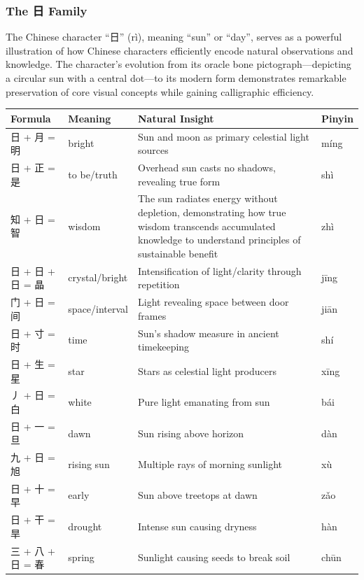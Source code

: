 \documentclass[11pt,letterpaper]{article}
\begin{document}
\subsubsection{The 日 Family}\label{the-ux65e5-family}

The Chinese character ``日'' (rì), meaning ``sun'' or ``day'', serves as
a powerful illustration of how Chinese characters efficiently encode
natural observations and knowledge. The character's evolution from its
oracle bone pictograph---depicting a circular sun with a central
dot---to its modern form demonstrates remarkable preservation of core
visual concepts while gaining calligraphic efficiency.

\begin{longtable}{|p{3cm}|p{3cm}|p{6cm}|p{2cm}|}
\hline
\textbf{Formula} & \textbf{Meaning} & \textbf{Natural Insight} & \textbf{Pinyin} \\
\hline
日 + 月 = 明 & bright & Sun and moon as primary celestial light sources
& míng \\
\hline
日 + 正 = 是 & to be/truth & Overhead sun casts no shadows, revealing
true form & shì \\
\hline
知 + 日 = 智 & wisdom & The sun radiates energy without depletion,
demonstrating how true wisdom transcends accumulated knowledge to
understand principles of sustainable benefit & zhì \\
\hline
日 + 日 + 日 = 晶 & crystal/bright & Intensification of light/clarity
through repetition & jīng \\
\hline
门 + 日 = 间 & space/interval & Light revealing space between door
frames & jiān \\
\hline
日 + 寸 = 时 & time & Sun's shadow measure in ancient timekeeping &
shí \\
\hline
日 + 生 = 星 & star & Stars as celestial light producers & xīng \\
\hline
丿 + 日 = 白 & white & Pure light emanating from sun & bái \\
\hline
日 + 一 = 旦 & dawn & Sun rising above horizon & dàn \\
\hline
九 + 日 = 旭 & rising sun & Multiple rays of morning sunlight & xù \\
\hline
日 + 十 = 早 & early & Sun above treetops at dawn & zǎo \\
\hline
日 + 干 = 旱 & drought & Intense sun causing dryness & hàn \\
\hline
三 + 八 + 日 = 春 & spring & Sunlight causing seeds to break soil &
chūn \\
\hline
\end{longtable}
\end{document}
